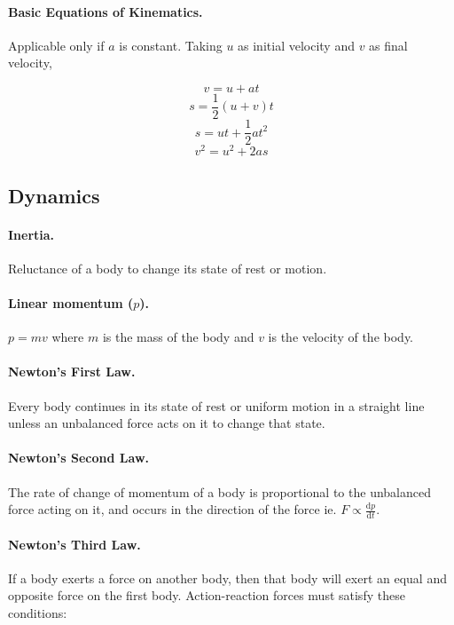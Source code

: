 \documentclass{article}
\begin{document}
\paragraph{Basic Equations of Kinematics.} Applicable only if $a$ is constant. Taking $u$ as initial velocity and $v$ as final velocity,

\begin{equation}
v = u + at
\end{equation}
\begin{equation}
s = \frac{1}{2}(u + v)t
\end{equation}
\begin{equation}
s = ut + \frac{1}{2}at^2
\end{equation}
\begin{equation}
v^2 = u^2 + 2as
\end{equation}

\subsection{Dynamics}

\paragraph{Inertia.} Reluctance of a body to change its state of rest or motion.

\paragraph{Linear momentum ($p$).} $p = mv$ where $m$ is the mass of the body and $v$ is the velocity of the body.

\paragraph{Newton's First Law.} Every body continues in its state of rest or uniform motion in a straight line unless an unbalanced force acts on it to change that state.

\paragraph{Newton's Second Law.} The rate of change of momentum of a body is proportional to the unbalanced force acting on it, and occurs in the direction of the force ie. $F \propto \frac{\mathrm{d}p}{\mathrm{d}t}$.

\paragraph{Newton's Third Law.} If a body exerts a force on another body, then that body will exert an equal and opposite force on the first body. Action-reaction forces must satisfy these conditions:
\end{document}
